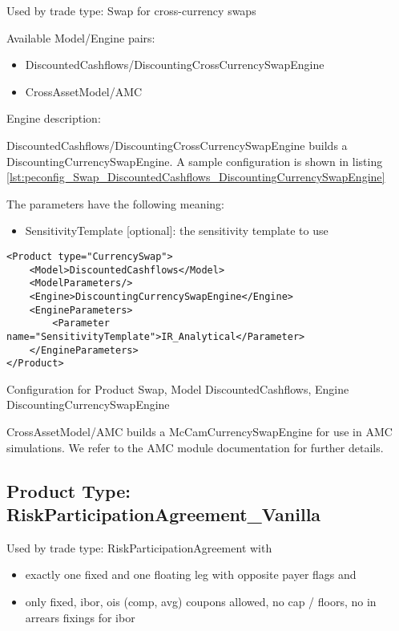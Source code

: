 Used by trade type: Swap for cross-currency swaps

Available Model/Engine pairs:

\begin{itemize}
\item DiscountedCashflows/DiscountingCrossCurrencySwapEngine
\item CrossAssetModel/AMC
\end{itemize}

Engine description:

DiscountedCashflows/DiscountingCrossCurrencySwapEngine builds a DiscountingCurrencySwapEngine. A sample configuration is
shown in listing \ref{lst:peconfig_Swap_DiscountedCashflows_DiscountingCurrencySwapEngine}

The parameters have the following meaning:

\begin{itemize}
\item SensitivityTemplate [optional]: the sensitivity template to use 
\end{itemize}

\begin{longlisting}
\begin{verbatim}
<Product type="CurrencySwap">
    <Model>DiscountedCashflows</Model>
    <ModelParameters/>
    <Engine>DiscountingCurrencySwapEngine</Engine>
    <EngineParameters>
        <Parameter name="SensitivityTemplate">IR_Analytical</Parameter>
    </EngineParameters>
</Product>
\end{verbatim}
\caption{Configuration for Product Swap, Model DiscountedCashflows, Engine DiscountingCurrencySwapEngine}
\label{lst:peconfig_Swap_DiscountedCashflows_DiscountingCurrencySwapEngine}
\end{longlisting}

CrossAssetModel/AMC builds a McCamCurrencySwapEngine for use in AMC simulations. We refer to the AMC module
documentation for further details.

\subsection{Product Type: RiskParticipationAgreement\_Vanilla}

Used by trade type: RiskParticipationAgreement with

\begin{itemize}
\item exactly one fixed and one floating leg with opposite payer flags and
\item only fixed, ibor, ois (comp, avg) coupons allowed, no cap / floors, no in arrears fixings for ibor
\end{itemize}

